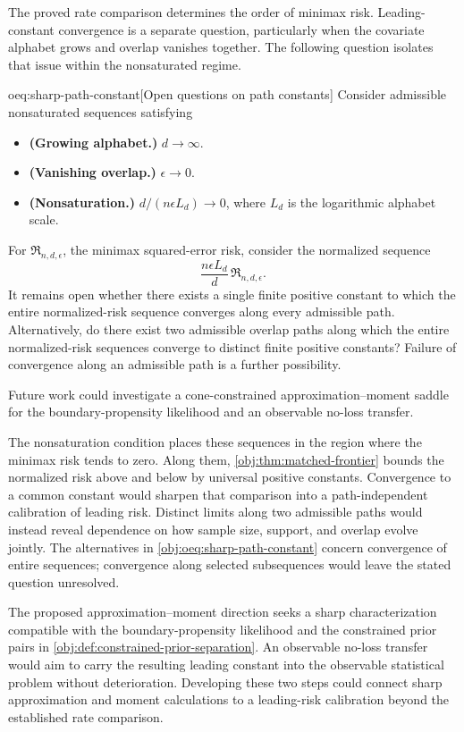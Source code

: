 The proved rate comparison determines the order of minimax risk. Leading-constant convergence is a separate question, particularly when the covariate alphabet grows and overlap vanishes together. The following question isolates that issue within the nonsaturated regime.

\begin{remarkv}{oeq:sharp-path-constant}[Open questions on path constants]
Consider admissible nonsaturated sequences satisfying
\begin{itemize}
\item \textbf{(Growing alphabet.)} \(d\to\infty\).
\item \textbf{(Vanishing overlap.)} \(\epsilon\to0\).
\item \textbf{(Nonsaturation.)} \(d/(n\epsilon L_d)\to0\), where \(L_d\) is the logarithmic alphabet scale.
\end{itemize}
For \(\mathfrak R_{n,d,\epsilon}\), the minimax squared-error risk, consider the normalized sequence
\[
\frac{n\epsilon L_d}{d}\,\mathfrak R_{n,d,\epsilon}.
\]
It remains open whether there exists a single finite positive constant to which the entire normalized-risk sequence converges along every admissible path. Alternatively, do there exist two admissible overlap paths along which the entire normalized-risk sequences converge to distinct finite positive constants? Failure of convergence along an admissible path is a further possibility.

Future work could investigate a cone-constrained approximation--moment saddle for the boundary-propensity likelihood and an observable no-loss transfer.
\end{remarkv}

The nonsaturation condition places these sequences in the region where the minimax risk tends to zero. Along them, \cref{obj:thm:matched-frontier} bounds the normalized risk above and below by universal positive constants. Convergence to a common constant would sharpen that comparison into a path-independent calibration of leading risk. Distinct limits along two admissible paths would instead reveal dependence on how sample size, support, and overlap evolve jointly. The alternatives in \cref{obj:oeq:sharp-path-constant} concern convergence of entire sequences; convergence along selected subsequences would leave the stated question unresolved.

The proposed approximation--moment direction seeks a sharp characterization compatible with the boundary-propensity likelihood and the constrained prior pairs in \cref{obj:def:constrained-prior-separation}. An observable no-loss transfer would aim to carry the resulting leading constant into the observable statistical problem without deterioration. Developing these two steps could connect sharp approximation and moment calculations to a leading-risk calibration beyond the established rate comparison.
